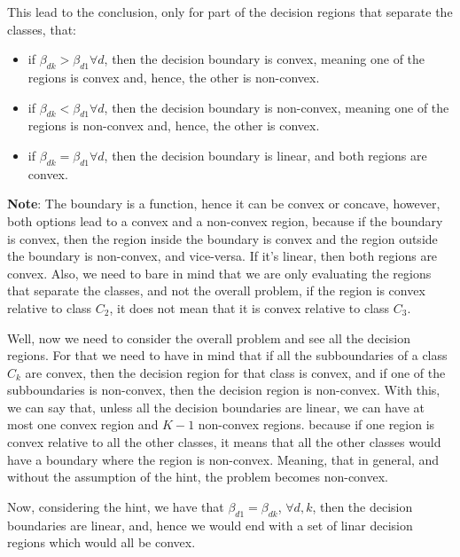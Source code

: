 \documentclass[12pt,a4paper,oneside]{paper}
\begin{document}
This lead to the conclusion, only for part of the decision regions that separate the classes, that: 
\begin{itemize}
    \setlength{\itemsep}{0pt} %
    \setlength{\parskip}{0pt} %
    \setlength{\leftskip}{15pt} %
    \item if $\beta_{dk} > \beta_{d1} \forall d$, then the decision boundary is convex, meaning one of the regions is convex and, hence, the other is non-convex.
    \item if $\beta_{dk} < \beta_{d1} \forall d$, then the decision boundary is non-convex, meaning one of the regions is non-convex and, hence, the other is convex.
    \item if $\beta_{dk} = \beta_{d1} \forall d$, then the decision boundary is linear, and both regions are convex. 
\end{itemize}

\textbf{Note}: The boundary is a function, hence it can be convex or concave, however, both options lead to a convex and a non-convex region, because if the boundary is convex, then the region inside the boundary is convex and the region outside the boundary is non-convex, and vice-versa. If it's linear, then both regions are convex.
Also, we need to bare in mind that we are only evaluating the regions that separate the classes, and not the overall problem, if the region is convex relative to class $C_2$, it does not mean that it is convex relative to class $C_3$.

Well, now we need to consider the overall problem and see all the decision regions. For that we need to have in mind that
if all the subboundaries of a class $C_k$ are convex, then the decision region for that class is convex, and if one of the subboundaries is non-convex, then the decision region is non-convex. 
With this, we can say that, unless all the decision boundaries are linear, we can have at most one convex region and $K - 1$ non-convex regions. because if one region is convex relative to all the other classes, it means that all the other classes would have a boundary where the region is non-convex.
Meaning, that in general, and without the assumption of the hint, the problem becomes non-convex.

Now, considering the hint, we have that $\beta_{d1} = \beta_{dk}$, $\forall d, k$, then the decision boundaries are linear, 
and, hence we would end with a set of linar decision regions which would all be convex. 
\end{document}

